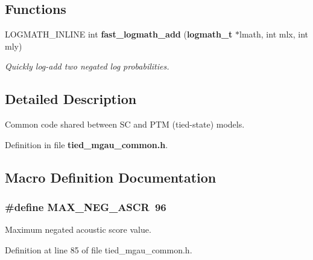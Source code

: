\subsection*{Functions}
\begin{DoxyCompactItemize}
\item 
L\-O\-G\-M\-A\-T\-H\-\_\-\-I\-N\-L\-I\-N\-E int {\bf fast\-\_\-logmath\-\_\-add} ({\bf logmath\-\_\-t} $\ast$lmath, int mlx, int mly)
\begin{DoxyCompactList}\small\item\em Quickly log-\/add two negated log probabilities. \end{DoxyCompactList}\end{DoxyCompactItemize}


\subsection{Detailed Description}
Common code shared between S\-C and P\-T\-M (tied-\/state) models. 

Definition in file {\bf tied\-\_\-mgau\-\_\-common.\-h}.



\subsection{Macro Definition Documentation}
\subsubsection[{M\-A\-X\-\_\-\-N\-E\-G\-\_\-\-A\-S\-C\-R}]{\setlength{\rightskip}{0pt plus 5cm}\#define M\-A\-X\-\_\-\-N\-E\-G\-\_\-\-A\-S\-C\-R~96}\label{tied__mgau__common_8h_a965d50d73044c3f2dc2589662fd2e89e}


Maximum negated acoustic score value. 



Definition at line 85 of file tied\-\_\-mgau\-\_\-common.\-h.

